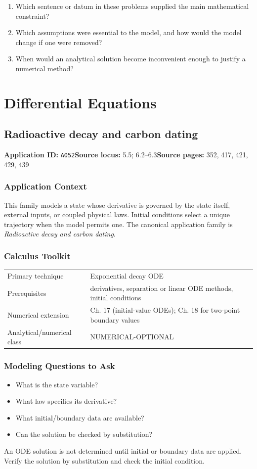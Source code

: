 \documentclass[11pt]{book}
\newcommand{\pid}[1]{\texttt{#1}}
\begin{document}
\begin{reflectionbox}\begin{enumerate}
\item Which sentence or datum in these problems supplied the main mathematical constraint?
\item Which assumptions were essential to the model, and how would the model change if one were removed?
\item When would an analytical solution become inconvenient enough to justify a numerical method?
\end{enumerate}\end{reflectionbox}
\part{Differential Equations}
\chapter{Radioactive decay and carbon dating}\label{app:A052}
\textbf{Application ID:} \pid{A052}\quad \textbf{Source locus:} 5.5; 6.2–6.3\quad \textbf{Source pages:} 352, 417, 421, 429, 439
\section*{Application Context}
This family models a state whose derivative is governed by the state itself, external inputs, or coupled physical laws. Initial conditions select a unique trajectory when the model permits one. The canonical application family is \emph{Radioactive decay and carbon dating}.
\section*{Calculus Toolkit}
\begin{tabularx}{\textwidth}{@{}lX@{}}\toprule
Primary technique & Exponential decay ODE \\
Prerequisites & derivatives, separation or linear ODE methods, initial conditions \\
Numerical extension & Ch. 17 (initial-value ODEs); Ch. 18 for two-point boundary values \\
Analytical/numerical class & NUMERICAL-OPTIONAL \\
\bottomrule\end{tabularx}
\section*{Modeling Questions to Ask}\begin{itemize}
\item What is the state variable?
\item What law specifies its derivative?
\item What initial/boundary data are available?
\item Can the solution be checked by substitution?
\end{itemize}
\begin{errorbox}An ODE solution is not determined until initial or boundary data are applied. Verify the solution by substitution and check the initial condition.\end{errorbox}
\end{document}
